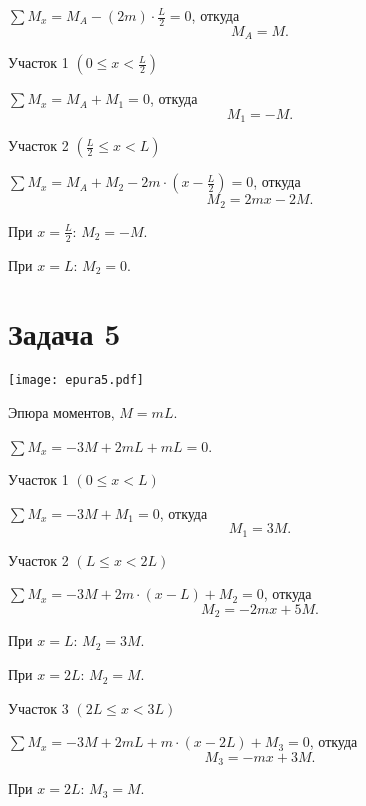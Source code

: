 $\sum M_x = M_A - \left(2m\right) \cdot \frac{L}{2} = 0$,
откуда
\[
    M_A = M.
\]

\vspace{1.5ex}

Участок 1 $\left(0 \le x < \frac{L}{2}\right)$

$\sum M_x = M_A + M_1 = 0$,
откуда
\[
    M_1 = -M.
\]

\vspace{1.5ex}

Участок 2 $ \left(\frac{L}{2} \le x < L\right)$

$\sum M_x = M_A + M_2 - 2m \cdot \left(x - \frac{L}{2}\right) = 0$,
откуда
\[
    M_2 = 2mx - 2M.
\]

При $x = \frac{L}{2}$: $M_2 = -M$.

При $x = L$: $M_2 = 0$.

\newpage


\section{Задача 5}

\begin{floatingfigure}[r]{0.5\textwidth}
    \centering
    \texttt{[image: epura5.pdf]}
    \caption{Эпюра моментов, $M = mL$.}
    \label{fig:chap1-epura5}
\end{floatingfigure}

$\sum M_x = -3M + 2mL + mL = 0$.

\vspace{1.5ex}

Участок 1 $\left(0 \le x < L\right)$

$\sum M_x = -3M + M_1 = 0$,
откуда
\[
    M_1 = 3M.
\]

\vspace{1.5ex}

Участок 2 $\left(L \le x < 2L\right) $

$\sum M_x = -3M + 2m \cdot \left(x- L\right) + M_2 =  0$,
откуда
\[
    M_2 = -2mx + 5M.
\]

При $x = L$: $M_2 = 3M$.

При $x = 2L$: $M_2 = M$.

\vspace{1.5ex}

Участок 3 $\left(2L \le x < 3L\right)$

$\sum M_x = -3M + 2mL + m \cdot \left(x- 2L\right) + M_3 = 0$,
откуда
\[
    M_3 = -mx + 3M.
\]

При $x = 2L$: $M_3 = M$.

